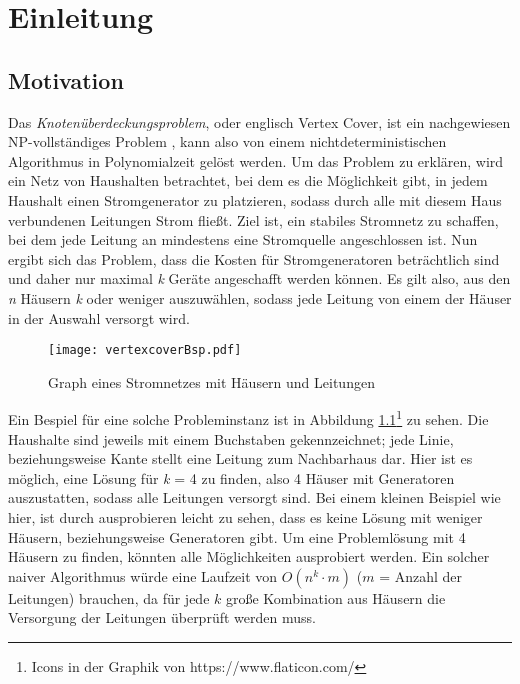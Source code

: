 
\chapter{Einleitung}
\label{ch:Einleitung}

\section{Motivation}
\label{ch:Einleitung:sec:Motivation}
Das \emph{Knotenüberdeckungsproblem}, oder englisch Vertex Cover, ist ein nachgewiesen NP-vollständiges Problem \cite{intract}, kann also von einem nichtdeterministischen Algorithmus in Polynomialzeit gelöst werden. Um das Problem zu erklären, wird ein Netz von Haushalten betrachtet, bei dem es die Möglichkeit gibt, in jedem Haushalt einen Stromgenerator zu platzieren, sodass durch alle mit diesem Haus verbundenen Leitungen Strom fließt. Ziel ist, ein stabiles Stromnetz zu schaffen, bei dem jede Leitung an mindestens eine Stromquelle angeschlossen ist. Nun ergibt sich das Problem, dass die Kosten für Stromgeneratoren beträchtlich sind und daher nur maximal \emph{k} Geräte angeschafft werden können. Es gilt also, aus den \emph{n} Häusern \emph{k} oder weniger auszuwählen, sodass jede Leitung von einem der Häuser in der Auswahl versorgt wird.
\begin{figure}[htb]
\centering
  	{\texttt{[image: vertexcoverBsp.pdf]}}
	\caption{Graph eines Stromnetzes mit Häusern und Leitungen \label{fig:vc}}
\centering
\end{figure}
Ein Bespiel für eine solche Probleminstanz ist in Abbildung \ref{fig:vc}\footnote{Icons in der Graphik von https://www.flaticon.com/} zu sehen. Die Haushalte sind jeweils mit einem Buchstaben gekennzeichnet; jede Linie, beziehungsweise Kante stellt eine Leitung zum Nachbarhaus dar. Hier ist es möglich, eine Lösung für \emph{k} = 4 zu finden, also 4 Häuser mit Generatoren auszustatten, sodass alle Leitungen versorgt sind. Bei einem kleinen Beispiel wie hier, ist durch ausprobieren leicht zu sehen, dass es keine Lösung mit weniger Häusern, beziehungsweise Generatoren gibt. Um eine Problemlösung mit 4 Häusern zu finden, könnten alle Möglichkeiten ausprobiert werden. Ein solcher naiver Algorithmus würde eine Laufzeit von $O(n^{k} \cdot m)$ ($m$ = Anzahl der Leitungen) brauchen, da für jede $k$ große Kombination aus Häusern die Versorgung der Leitungen überprüft werden muss.\\
